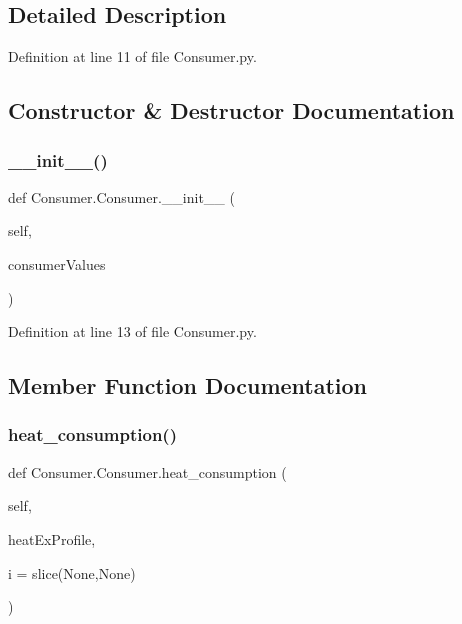 \subsection{Detailed Description}


Definition at line 11 of file Consumer.\+py.



\subsection{Constructor \& Destructor Documentation}
\mbox{\label{class_consumer_1_1_consumer_ac4c06a6de40e3415a3e11460a8430be3}} 
\subsubsection{\texorpdfstring{\+\_\+\+\_\+init\+\_\+\+\_\+()}{\_\_init\_\_()}}
{\footnotesize\ttfamily def Consumer.\+Consumer.\+\_\+\+\_\+init\+\_\+\+\_\+ (\begin{DoxyParamCaption}\item[{}]{self,  }\item[{}]{consumer\+Values }\end{DoxyParamCaption})}



Definition at line 13 of file Consumer.\+py.



\subsection{Member Function Documentation}
\mbox{\label{class_consumer_1_1_consumer_a25287e5a16d9185b04c419b8899d3380}} 
\subsubsection{\texorpdfstring{heat\+\_\+consumption()}{heat\_consumption()}}
{\footnotesize\ttfamily def Consumer.\+Consumer.\+heat\+\_\+consumption (\begin{DoxyParamCaption}\item[{}]{self,  }\item[{}]{heat\+Ex\+Profile,  }\item[{}]{i = {\ttfamily slice(None,None)} }\end{DoxyParamCaption})}



